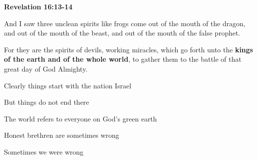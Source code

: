 \documentclass[dark]{gsf-presentation}
\begin{document}
\begin{frame}[plain]{\textbf{\textcolor{SecondColor}{\LARGE Revelation 16:13-14}}}
	\LARGE
	\begin{center}
		And I saw three unclean spirits like frogs
		come out of the mouth of the dragon, and out
		of the mouth of the beast, and out of the mouth
		of the false prophet.

		\vspace{2mm}
		For they are the spirits of devils, working miracles,
		which go forth unto the 
		\textbf{kings of the earth and of the whole world},
		to gather them to the battle of that great day of
		God Almighty.
	\end{center}
\end{frame}

\begin{frame}
	\LARGE
	Clearly things start with the nation Israel

	But things do not end there

	The world refers to everyone on God's green earth
\end{frame}

\begin{frame}
	\LARGE
	Honest brethren are sometimes wrong

	Sometimes we were wrong
\end{frame}
\end{document}

